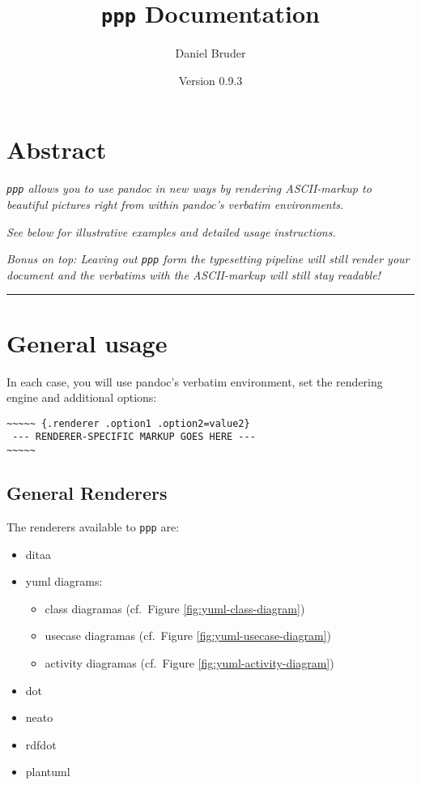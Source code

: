 \documentclass[]{article}
\title{\texttt{ppp} Documentation}
\author{Daniel Bruder}
\date{Version 0.9.3}
\begin{document}
\maketitle

\newpage

\section{Abstract}\label{abstract}

\emph{\texttt{ppp} allows you to use pandoc in new ways by rendering
ASCII-markup to beautiful pictures right from within pandoc's verbatim
environments.}

\emph{See below for illustrative examples and detailed usage
instructions.}

\emph{Bonus on top: Leaving out \texttt{ppp} form the typesetting
pipeline will still render your document and the verbatims with the
ASCII-markup will still stay readable!}

\begin{center}\rule{3in}{0.4pt}\end{center}

\newpage
\tableofcontents
\newpage

\section{General usage}\label{general-usage}

In each case, you will use pandoc's verbatim environment, set the
rendering engine and additional options:

\begin{verbatim}
~~~~~ {.renderer .option1 .option2=value2}
 --- RENDERER-SPECIFIC MARKUP GOES HERE ---
~~~~~
\end{verbatim}

\subsection{General Renderers}\label{general-renderers}

The renderers available to \texttt{ppp} are:

\begin{itemize}
\itemsep1pt\parskip0pt
\item
  ditaa
\item
  yuml diagrams:

  \begin{itemize}
  \itemsep1pt\parskip0pt
  \item
    class diagramas (cf.~Figure \ref{fig:yuml-class-diagram})
  \item
    usecase diagramas (cf.~Figure \ref{fig:yuml-usecase-diagram})
  \item
    activity diagramas (cf.~Figure \ref{fig:yuml-activity-diagram})
  \end{itemize}
\item
  dot
\item
  neato
\item
  rdfdot
\item
  plantuml
\end{itemize}
\end{document}
